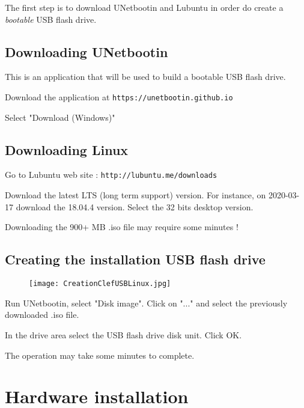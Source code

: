 \documentclass[a4paper]{ffco-rapport}
\begin{document}
  The first step is to download UNetbootin and Lubuntu in order do create a \emph{bootable} USB flash drive.
	
	\section{Downloading UNetbootin}

		This is an application that will be used to build a bootable USB flash drive.

		Download the application at \verb|https://unetbootin.github.io|

		Select "Download (Windows)"

	\section{Downloading Linux}
	  Go to Lubuntu web site : \verb|http://lubuntu.me/downloads|
		
		Download the latest LTS (long term support) version. For instance, on 2020-03-17 download the 18.04.4 version. Select the 32 bits desktop version.

		Downloading the 900+ MB .iso file may require some minutes !

	\section{Creating the installation USB flash drive}
\begin{figure}[!ht]
	\centering
		\texttt{[image: CreationClefUSBLinux.jpg]}
	\label{fig:a}
\end{figure}
Run UNetbootin, select "Disk image". Click on "..." and select the previously downloaded .iso file.

In the drive area select the USB flash drive disk unit. Click OK.

The operation may take some minutes to complete.

\chapter{Hardware installation}
\end{document}
